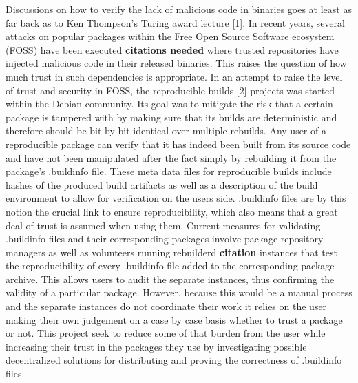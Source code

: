 \documentclass{article}
\begin{document}
Discussions on how to verify the lack of malicious code in binaries goes at least as far back as to Ken Thompson's Turing award lecture [1]. In recent years, several attacks on popular packages within the Free Open Source Software ecosystem (FOSS) have been executed \textbf{citations needed} where trusted repositories have injected malicious code in their released binaries. This raises the question of how much trust in such dependencies is appropriate. In an attempt to raise the level of trust and security in FOSS, the reproducible builds [2] projects was started within the Debian community. Its goal was to mitigate the risk that a certain package is tampered with by making sure that its builds are deterministic and therefore should be bit-by-bit identical over multiple rebuilds. Any user of a reproducible package can verify that it has indeed been built from its source code and have not been manipulated after the fact simply by rebuilding it from the package's .buildinfo file. These meta data files for reproducible builds include hashes of the produced build artifacts as well as a description of the build environment to allow for verification on the users side. .buildinfo files are by this notion the crucial link to ensure reproducibility, which also means that a great deal of trust is assumed when using them. Current measures for validating .buildinfo files and their corresponding packages involve package repository managers as well as volunteers running rebuilderd \textbf{citation} instances that test the reproducibility of every .buildinfo file added to the corresponding package archive. This allows users to audit the separate instances, thus confirming the validity of a particular package. However, because this would be a manual process and the separate instances do not coordinate their work it relies on the user making their own judgement on a case by case basis whether to trust a package or not. This project seek to reduce some of that burden from the user while increasing their trust in the packages they use by investigating possible decentralized solutions for distributing and proving the correctness of .buildinfo files.



\end{document}
